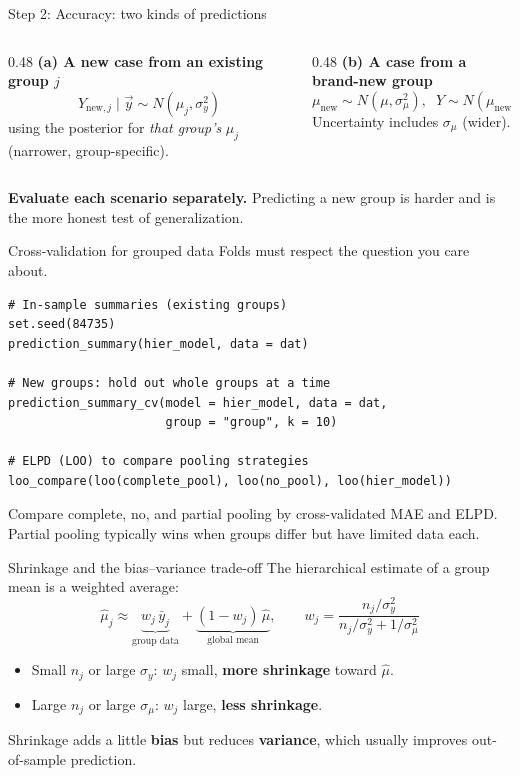 \documentclass[aspectratio=43,11pt]{beamer}
\begin{document}
\begin{frame}{Step 2: Accuracy: two kinds of predictions}
  \begin{columns}[T]
    \begin{column}{0.48\textwidth}
      \textbf{(a) A new case from an existing group $j$}
      \[
        Y_{\text{new},j}\mid\vec y\sim N(\mu_j,\sigma_y^2)
      \]
      using the posterior for \emph{that group's} $\mu_j$ (narrower, group-specific).
    \end{column}
    \begin{column}{0.48\textwidth}
      \textbf{(b) A case from a brand-new group}
      \[
        \mu_{\text{new}}\sim N(\mu,\sigma_\mu^2),\;\; Y\sim N(\mu_{\text{new}},\sigma_y^2)
      \]
      Uncertainty includes $\sigma_\mu$ (wider).
    \end{column}
  \end{columns}
  \vspace{0.5em}
  \textbf{Evaluate each scenario separately.} Predicting a new group is harder and is the more honest test of generalization.
\end{frame}

\begin{frame}[fragile]{Cross-validation for grouped data}
  Folds must respect the question you care about.
\begin{lstlisting}
# In-sample summaries (existing groups)
set.seed(84735)
prediction_summary(hier_model, data = dat)

# New groups: hold out whole groups at a time
prediction_summary_cv(model = hier_model, data = dat,
                      group = "group", k = 10)

# ELPD (LOO) to compare pooling strategies
loo_compare(loo(complete_pool), loo(no_pool), loo(hier_model))
\end{lstlisting}
  Compare complete, no, and partial pooling by cross-validated MAE and ELPD. Partial pooling typically wins when groups differ but have limited data each.
\end{frame}

\begin{frame}{Shrinkage and the bias--variance trade-off}
  The hierarchical estimate of a group mean is a weighted average:
  \[
    \hat\mu_j\approx \underbrace{w_j\,\bar y_j}_{\text{group data}}+\underbrace{(1-w_j)\,\hat\mu}_{\text{global mean}},
    \qquad
    w_j=\frac{n_j/\sigma_y^2}{n_j/\sigma_y^2+1/\sigma_\mu^2}
  \]
  \begin{itemize}
    \item Small $n_j$ or large $\sigma_y$: $w_j$ small, \textbf{more shrinkage} toward $\hat\mu$.
    \item Large $n_j$ or large $\sigma_\mu$: $w_j$ large, \textbf{less shrinkage}.
  \end{itemize}
  Shrinkage adds a little \textbf{bias} but reduces \textbf{variance}, which usually improves out-of-sample prediction.
\end{frame}
\end{document}
